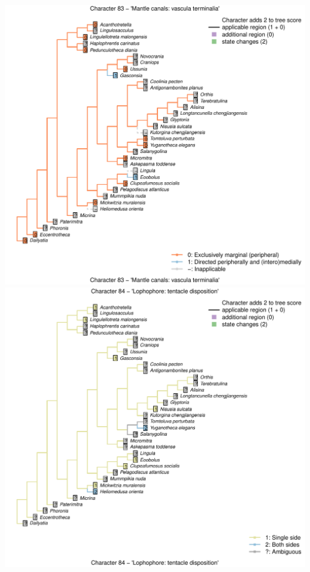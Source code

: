 \documentclass[]{book}
\theoremstyle{definition}
\theoremstyle{definition}
\theoremstyle{definition}
\theoremstyle{remark}
\begin{document}
\includegraphics{Brachiopod_phylogeny_files/figure-latex/unnamed-chunk-4-83.pdf}
\includegraphics{Brachiopod_phylogeny_files/figure-latex/unnamed-chunk-4-84.pdf}
\end{document}

